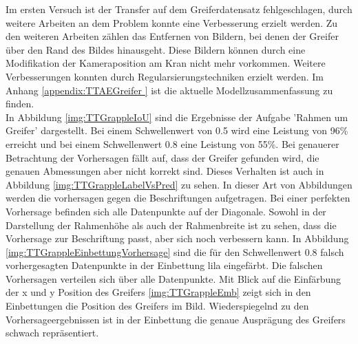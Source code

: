  	Im ersten Versuch ist der Transfer auf dem Greiferdatensatz fehlgeschlagen, durch weitere Arbeiten an dem Problem konnte eine Verbesserung erzielt werden. Zu den weiteren Arbeiten zählen das Entfernen von Bildern, bei denen der Greifer über den Rand des Bildes hinausgeht. Diese Bildern können durch eine Modifikation der Kameraposition am Kran nicht mehr vorkommen. Weitere Verbesserungen konnten durch Regularsierungstechniken erzielt werden. Im Anhang \ref{appendix:TTAEGreifer } ist die aktuelle Modellzusammenfassung zu finden. \\
 	In Abbildung \ref{img:TTGrappleIoU} sind die Ergebnisse der Aufgabe 'Rahmen um Greifer' dargestellt. Bei einem Schwellenwert von 0.5 wird eine Leistung von 96\% erreicht und bei einem Schwellenwert 0.8 eine Leistung von 55\%. Bei genauerer Betrachtung der Vorhersagen fällt auf, dass der Greifer gefunden wird, die genauen Abmessungen aber nicht korrekt sind. Dieses Verhalten ist auch in Abbildung \ref{img:TTGrappleLabelVsPred} zu sehen. In dieser Art von Abbildungen werden die vorhersagen gegen die Beschriftungen aufgetragen. Bei einer perfekten Vorhersage befinden sich alle Datenpunkte auf der Diagonale. Sowohl in der Darstellung der Rahmenhöhe als auch der Rahmenbreite ist zu sehen, dass die Vorhersage zur Beschriftung passt, aber sich noch verbessern kann. In Abbildung \ref{img:TTGrappleEinbettungVorhersage} sind die für den Schwellenwert 0.8 falsch vorhergesagten Datenpunkte in der Einbettung lila eingefärbt. Die falschen Vorhersagen verteilen sich über alle Datenpunkte. Mit Blick auf die Einfärbung der x und y Position des Greifers \ref{img:TTGrappleEmb} zeigt sich in den Einbettungen die Position des Greifers im Bild. Wiederspiegelnd zu den Vorhersageergebnissen ist in der Einbettung die genaue Ausprägung des Greifers schwach repräsentiert.
